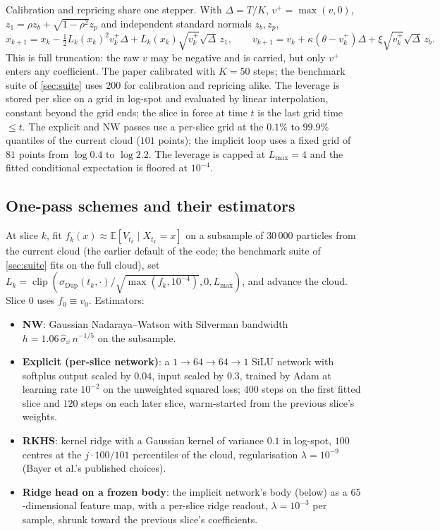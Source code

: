 \documentclass[11pt,a4paper]{article}
\newcommand{\E}{\mathbb{E}}
\newcommand{\sigDup}{\sigma_{\mathrm{Dup}}}
\newcommand{\Lev}{L}
\newcommand{\Lmax}{L_{\max}}
\begin{document}
Calibration and repricing share one stepper. With $\Delta=T/K$, $v^+=\max(v,0)$, $z_1=\rho z_b+\sqrt{1-\rho^2}z_p$ and independent standard normals $z_b,z_p$,
\begin{equation}\label{eq:euler}
  x_{k+1} = x_k-\tfrac12\Lev_k(x_k)^2v_k^+\Delta+\Lev_k(x_k)\sqrt{v_k^+}\sqrt{\Delta}\,z_1,\qquad
  v_{k+1} = v_k+\kappa(\theta-v_k^+)\Delta+\xi\sqrt{v_k^+}\sqrt{\Delta}\,z_b .
\end{equation}
This is full truncation: the raw $v$ may be negative and is carried, but only $v^+$ enters any coefficient. The paper calibrated with $K=50$ steps; the benchmark suite of \cref{sec:suite} uses $200$ for calibration and repricing alike. The leverage is stored per slice on a grid in log-spot and evaluated by linear interpolation, constant beyond the grid ends; the slice in force at time $t$ is the last grid time $\le t$. The explicit and NW passes use a per-slice grid at the $0.1\%$ to $99.9\%$ quantiles of the current cloud ($101$ points); the implicit loop uses a fixed grid of $81$ points from $\log 0.4$ to $\log 2.2$. The leverage is capped at $\Lmax=4$ and the fitted conditional expectation is floored at $10^{-4}$.

\subsection{One-pass schemes and their estimators}\label{sec:onepass}

At slice $k$, fit $f_k(x)\approx\E[V_{t_k}\mid X_{t_k}=x]$ on a subsample of $30\,000$ particles from the current cloud (the earlier default of the code; the benchmark suite of \cref{sec:suite} fits on the full cloud), set $\Lev_k=\operatorname{clip}(\sigDup(t_k,\cdot)/\sqrt{\max(f_k,10^{-4})},0,\Lmax)$, and advance the cloud. Slice $0$ uses $f_0\equiv v_0$. Estimators:
\begin{itemize}
\item \textbf{NW}: Gaussian Nadaraya--Watson with Silverman bandwidth $h=1.06\,\hat\sigma_x\,n^{-1/5}$ on the subsample.
\item \textbf{Explicit (per-slice network)}: a $1\to64\to64\to1$ SiLU network with softplus output scaled by $0.04$, input scaled by $0.3$, trained by Adam at learning rate $10^{-2}$ on the unweighted squared loss; $400$ steps on the first fitted slice and $120$ steps on each later slice, warm-started from the previous slice's weights.
\item \textbf{RKHS}: kernel ridge with a Gaussian kernel of variance $0.1$ in log-spot, $100$ centres at the $j\cdot100/101$ percentiles of the cloud, regularisation $\lambda=10^{-9}$ (Bayer et al.'s published choices).
\item \textbf{Ridge head on a frozen body}: the implicit network's body (below) as a $65$-dimensional feature map, with a per-slice ridge readout, $\lambda=10^{-3}$ per sample, shrunk toward the previous slice's coefficients.
\end{itemize}
\end{document}
